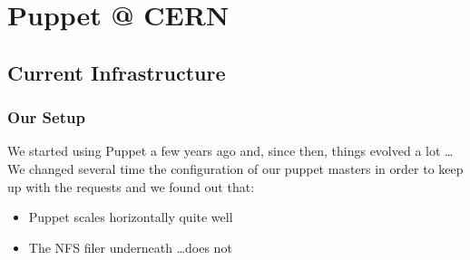 \documentclass[aspectratio=169]{beamer}
\begin{document}
\section{Puppet @ CERN}

\subsection{Current Infrastructure}
\begin{frame}
    \frametitle{Our Setup}
    We started using Puppet a few years ago and, since then, 
    things evolved a lot \ldots \\
    \vspace{1em}
    We changed several time the configuration of our puppet masters in order 
    to keep up with the requests and we found out that:
    
    \begin{itemize}
        \item Puppet scales horizontally quite well
        \item The NFS filer underneath \ldots does not
    \end{itemize}
\end{frame}

\end{document}

